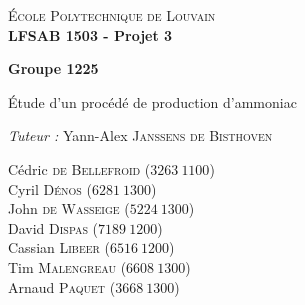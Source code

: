 \begin{titlepage}
    \begin{center}
        \vspace*{1cm}
        
        \large
	\textsc{École Polytechnique de Louvain} \\
	\textbf{LFSAB 1503 - Projet 3} \\        
        \vspace{1cm}
        
        \textbf{Groupe 1225}
        
        \vspace{0.5cm}
        
        \Huge
	Étude d'un procédé de production d'ammoniac
        \vspace{0,5cm}
        
        

        \vfill 
        \large

	\begin{flushright}

	\textit{Tuteur : } Yann-Alex \textsc{Janssens de Bisthoven} \vspace{1\baselineskip}

	Cédric \textsc{de Bellefroid}  ($3263~1100$) \\
	Cyril \textsc{Dénos}  ($6281~1300$) \\
	John \textsc{de Wasseige}  ($5224~1300$) \\
	David \textsc{Dispas}  ($7189~1200$) \\
	Cassian \textsc{Libeer}   ($6516~1200$) \\
	Tim \textsc{Malengreau}  ($6608~1300$) \\
	Arnaud \textsc{Paquet}  ($3668~1300$) \\       
	\end{flushright}
        
    \end{center}
\end{titlepage}
